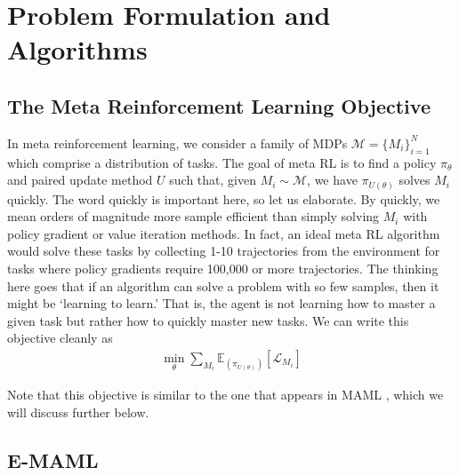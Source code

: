 \documentclass{article} %
\begin{document}
\section{Problem Formulation and Algorithms}

\subsection{The Meta Reinforcement Learning Objective}
In meta reinforcement learning, we consider a family of MDPs $\mathcal{M} = \{M_i \}_{i=1}^N$ which comprise a distribution of tasks. The goal of meta RL is to find a policy $\pi_\theta$ and paired update method $U$ such that, given $M_i \sim \mathcal{M}$, we have $\pi_{U(\theta)}$ solves $M_i$ quickly. The word quickly is important here, so let us elaborate. By quickly, we mean orders of magnitude more sample efficient than simply solving $M_i$ with policy gradient or value iteration methods. In fact, an ideal meta RL algorithm would solve these tasks by collecting 1-10 trajectories from the environment for tasks where policy gradients require 100,000 or more trajectories. The thinking here goes that if an algorithm can solve a problem with so few samples, then it might be `learning to learn.' That is, the agent is not learning how to master a given task but rather how to quickly master new tasks. We can write this objective cleanly as 
\begin{align}
    \min_\theta \sum_{M_i} \mathbb{E}_{(\pi_{U(\theta)})} \left[ \mathcal{L}_{M_i} \right]
    \label{eq:objective}
\end{align}

Note that this objective is similar to the one that appears in MAML \cite{maml}, which we will discuss further below. 


\subsection{E-MAML} 
\end{document}
